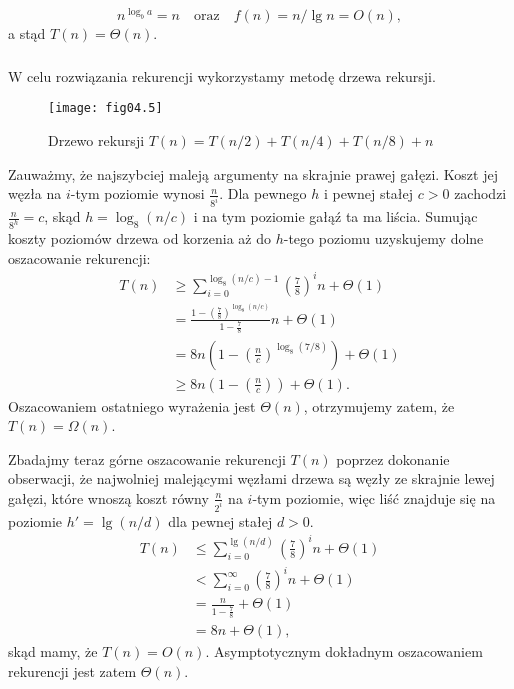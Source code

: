 \subsubsection{} %
\[
	n^{\log_ba} = n \quad\text{oraz}\quad f(n) = n/\!\lg n = O(n),
\]
a stąd $T(n)=\Theta(n)$.

\subsubsection{} %
W celu rozwiązania rekurencji wykorzystamy metodę drzewa rekursji.
\begin{figure}[ht]
	\begin{center}
		\texttt{[image: fig04.5]}
	\end{center}
	\caption{Drzewo rekursji $T(n)=T(n/2)+T(n/4)+T(n/8)+n$} \label{fig:4-4f}
\end{figure}
Zauważmy, że najszybciej maleją argumenty na skrajnie prawej gałęzi. Koszt jej węzła na $i$-tym poziomie wynosi $\frac{n}{8^i}$. Dla pewnego $h$ i pewnej stałej $c>0$ zachodzi $\frac{n}{8^h}=c$, skąd $h=\log_8(n/c)$ i na tym poziomie gałąź ta ma liścia. Sumując koszty poziomów drzewa od korzenia aż do $h$-tego poziomu uzyskujemy dolne oszacowanie rekurencji:
\begin{align*}
	T(n) &\ge \sum_{i=0}^{\log_8(n/c)-1}\left(\frac{7}{8}\right)^in+\Theta(1) \\
	&= \frac{1-\left(\frac{7}{8}\right)^{\log_8(n/c)}}{1-\frac{7}{8}}n+\Theta(1) \\
	&= 8n\left(1-\left(\frac{n}{c}\right)^{\log_8(7/8)}\right)+\Theta(1) \\
	&\ge 8n\left(1-\left(\frac{n}{c}\right)\right)+\Theta(1).
\end{align*}
Oszacowaniem ostatniego wyrażenia jest $\Theta(n)$, otrzymujemy zatem, że $T(n)=\Omega(n)$.

Zbadajmy teraz górne oszacowanie rekurencji $T(n)$ poprzez dokonanie obserwacji, że najwolniej malejącymi węzłami drzewa są węzły ze skrajnie lewej gałęzi, które wnoszą koszt równy $\frac{n}{2^i}$ na $i$-tym poziomie, więc liść znajduje się na poziomie $h'=\lg(n/d)$ dla pewnej stałej $d>0$.
\begin{align*}
	T(n) &\le \sum_{i=0}^{\lg(n/d)}\left(\frac{7}{8}\right)^in+\Theta(1) \\
	&< \sum_{i=0}^\infty\left(\frac{7}{8}\right)^in+\Theta(1) \\
	&= \frac{n}{1-\frac{7}{8}}+\Theta(1) \\
	&= 8n+\Theta(1),
\end{align*}
skąd mamy, że $T(n)=O(n)$. Asymptotycznym dokładnym oszacowaniem rekurencji jest zatem $\Theta(n)$.

